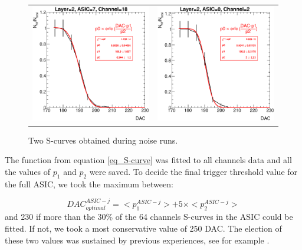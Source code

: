 \documentclass[a4paper,11pt]{article}
\begin{document}
\begin{figure}[!t]
  \centering
  \begin{tabular}{ll}
  \includegraphics[width=2.8in]{figs/commissioning/scurve_chn18_asic7_layer2.eps} & \includegraphics[width=2.8in]{figs/commissioning/scurve_chn2_asic0_layer2.eps}
  \end{tabular}
\caption{Two S-curves obtained during noise runs.}
\label{scurve_channels}
\end{figure}

The function from equation \ref{eq_S-curve} was fitted to all
channels data and all the values of $p_{1}$ and $p_{2}$ were saved.
To decide the final trigger threshold value for the full ASIC, we took the maximum between:

\begin{equation}
DAC_{optimal}^{ASIC-j} = <p_{1}^{ASIC-j}> + 5 \times <p_{2}^{ASIC-j}>
\end{equation}
and 230 if more than the 30\% of the 64 channels S-curves in the ASIC could be fitted. 
If not, we took a most conservative value of 250 DAC. The election of these two values was 
sustained by previous experiences, see for example \cite{Amjad:2014tha}.
\end{document}
